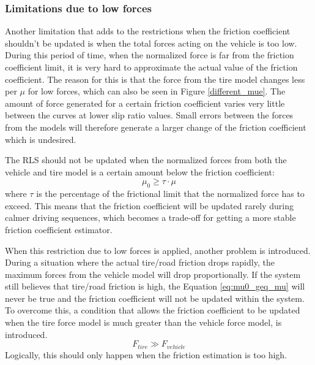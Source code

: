 \subsubsection{Limitations due to low forces}
Another limitation that adds to the restrictions when the friction coefficient shouldn't be updated is when the total forces acting on the vehicle is too low. During this period of time, when the normalized force is far from the friction coefficient limit, it is very hard to approximate the actual value of the friction coefficient. The reason for this is that the force from the tire model changes less per $ \mu $ for low forces, which can also be seen in Figure \ref{different_mue}. The amount of force generated for a certain friction coefficient varies very little between the curves at lower slip ratio values. Small errors between the forces from the models will therefore generate a larger change of the friction coefficient which is undesired. 

The RLS should not be updated when the normalized forces from both the vehicle and tire model is a certain amount below the friction coefficient:
\begin{equation}
	\mu_{0} \geq \tau \cdot \mu
	\label{eq:mu0_geq_mu}
\end{equation}
where $ \tau $ is the percentage of the frictional limit that the normalized force has to exceed. This means that the friction coefficient will be updated rarely during calmer driving sequences, which becomes a trade-off for getting a more stable friction coefficient estimator. 

When this restriction due to low forces is applied, another problem is introduced. During a situation where the actual tire/road friction drops rapidly, the maximum forces from the vehicle model will drop proportionally. If the system still believes that tire/road friction is high, the Equation \ref{eq:mu0_geq_mu} will never be true and the friction coefficient will not be updated within the system. To overcome this, a condition that allows the friction coefficient to be updated when the tire force model is much greater than the vehicle force model, is introduced.
\begin{equation}
	F_{tire} \gg F_{vehicle}
\end{equation}
Logically, this should only happen when the friction estimation is too high. 

